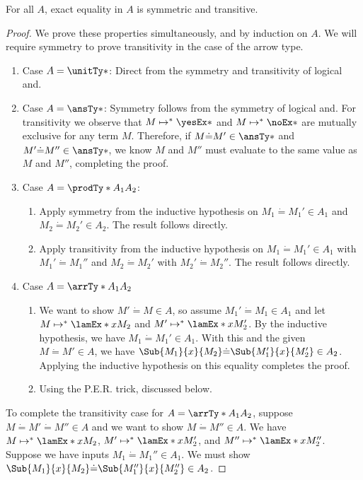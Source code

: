 \documentclass[letterpaper]{article}
\begin{document}
\begin{lemma}
    For all $A$, exact equality in $A$ is symmetric and transitive. 
\end{lemma}
\begin{proof}
We prove these properties simultaneously, and by induction on $A$. We will require symmetry to prove transitivity in the case of the arrow type. 

\begin{enumerate}
    \item Case $A = \unitTy*$: Direct from the symmetry and transitivity of logical and.
    \item Case $A = \ansTy*$: Symmetry follows from the symmetry of logical and. For transitivity we observe that $M \mapsto^* \yesEx*$ and $M \mapsto^* \noEx*$
    are mutually exclusive for any term $M$. Therefore, if $M \dot{=} M' \in \ansTy*$ and $M' \dot{=} M'' \in \ansTy*$, we know $M$ and $M''$ must evaluate to
    the same value as $M$ and $M''$, completing the proof.
    \item Case $A = \prodTy*{A_1}{A_2}$: 
    \begin{enumerate}
        \item Apply symmetry from the inductive hypothesis on $M_1 \dot{=} M_1' \in A_1$ and $M_2 \dot{=} M_2' \in A_2$. The result follows directly.
        \item Apply transitivity from the inductive hypothesis on $M_1 \dot{=} M_1' \in A_1$ with $M_1' \dot{=} M_1''$ and $M_2 \dot{=} M_2'$ with $M_2' \dot{=} M_2''$.
        The result follows directly.
    \end{enumerate}
    \item Case $A = \arrTy*{A_1}{A_2}$
    \begin{enumerate}
        \item We want to show $M' \dot{=} M \in A$, so assume $M_1' \dot{=} M_1 \in A_1$ and let $M \mapsto^* \lamEx*{x}{M_2}$ and $M' \mapsto^* \lamEx*{x}{M_2'}$. 
        By the inductive hypothesis, we have $M_1 \dot{=} M_1' \in A_1$. With this and the given $M \dot{=} M' \in A$,
        we have $\Sub{M_1}{x}{M_2} \dot{=} \Sub{M_1'}{x}{M_2'} \in A_2$. Applying the inductive hypothesis on this equality completes the proof. 
        \item Using the P.E.R. trick, discussed below.
    \end{enumerate}
\end{enumerate}

To complete the transitivity case for $A = \arrTy*{A_1}{A_2}$, suppose $M \dot{=} M' \dot{=} M'' \in A$ and we want to show $M \dot{=} M'' \in A$. 
We have $M \mapsto^* \lamEx*{x}{M_2}$, $M' \mapsto^* \lamEx*{x}{M_2'}$, and $M'' \mapsto^* \lamEx*{x}{M_2''}$. Suppose we have inputs $M_1 \dot{=} M_1'' \in A_1$. 
We must show $\Sub{M_1}{x}{M_2} \dot{=} \Sub{M_1''}{x}{M_2''} \in A_2$.


\end{proof}
\end{document}
